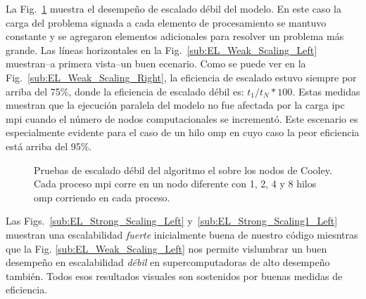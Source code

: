{La Fig.~\ref{fig:EL_Weak_Scaling} muestra el desempeño de escalado débil del modelo.
En este caso la carga del problema signada a cada elemento de procesamiento se mantuvo constante  y se agregaron elementos adicionales para resolver un problema más grande.
Las líneas horizontales en la Fig.~\ref{sub:EL_Weak_Scaling_Left} muestran--a primera vista--un buen ecenario.
Como se puede ver en la Fig.~\ref{sub:EL_Weak_Scaling_Right}, la eficiencia de escalado estuvo siempre por arriba del 75\%, donde la eficiencia de escalado débil es: $t_1 / t_N * 100$.
Estas medidas muestran que la ejecución paralela del modelo no fue afectada por la carga \gls{ipc} \gls{mpi} cuando el número de nodos computacionales se incrementó.
Este escenario es especialmente evidente para el caso de un hilo \gls{omp} en cuyo caso la peor eficiencia está arriba del 95\%.

\begin{figure}[tb] 
    \centering
    \hfill

	\caption{Pruebas de escalado débil del algoritmo \gls{el} sobre los nodos de Cooley. Cada proceso \gls{mpi} corre en un nodo diferente con 1, 2, 4 y 8 hilos \gls{omp} corriendo en cada proceso.}
  \label{fig:EL_Weak_Scaling} 
\end{figure}

Las Figs.~\ref{sub:EL_Strong_Scaling_Left} y~\ref{sub:EL_Strong_Scaling1_Left} muestran una escalabilidad \emph{fuerte} inicialmente buena de nuestro código miesntras que la Fig. \ref{sub:EL_Weak_Scaling_Left} nos permite vislumbrar un buen desempeño en escalabilidad \emph{débil} en supercomputadoras de alto desempeño también.
Todos esos resultados visuales son sostenidos por buenas medidas de eficiencia.
}{
}
